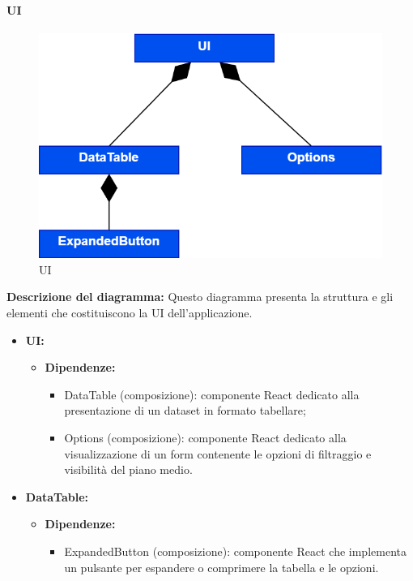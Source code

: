 \paragraph{UI}
\begin{figure}[h!] \centering
      \includegraphics[scale=0.3]{template/images/uml_front/ui/UI.png}
      \caption{UI}
\end{figure}
\textbf{Descrizione del diagramma:}
Questo diagramma presenta la struttura e gli elementi che costituiscono la UI dell'applicazione.
\begin{itemize}
      \item \textbf{UI:}
            \begin{itemize}
                  \item \textbf{Dipendenze:}
                        \begin{itemize}
                              \item DataTable (composizione): componente React dedicato alla presentazione di un
                                    dataset in formato tabellare;
                              \item Options (composizione): componente React dedicato alla visualizzazione di un
                                    form contenente le opzioni di filtraggio e visibilità del piano medio.
                        \end{itemize}
            \end{itemize}

      \item \textbf{DataTable:}
            \begin{itemize}
                  \item \textbf{Dipendenze:}
                        \begin{itemize}
                              \item ExpandedButton (composizione): componente React che implementa un pulsante per
                                    espandere o comprimere la tabella e le opzioni.
                        \end{itemize}
            \end{itemize}
\end{itemize}

